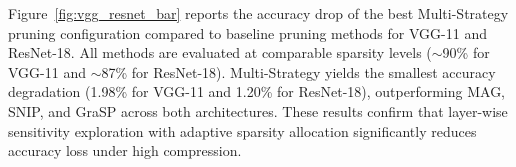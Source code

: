 \documentclass[11pt, conference]{IEEEtran}
\begin{document}

Figure~\ref{fig:vgg_resnet_bar} reports the accuracy drop of the best Multi-Strategy pruning configuration compared to baseline pruning methods for VGG-11 and ResNet-18. All methods are evaluated at comparable sparsity levels ($\sim$90\% for VGG-11 and $\sim$87\% for ResNet-18). Multi-Strategy yields the smallest accuracy degradation (1.98\% for VGG-11 and 1.20\% for ResNet-18), outperforming MAG, SNIP, and GraSP across both architectures. These results confirm that layer-wise sensitivity exploration with adaptive sparsity allocation significantly reduces accuracy loss under high compression.








\end{document}
